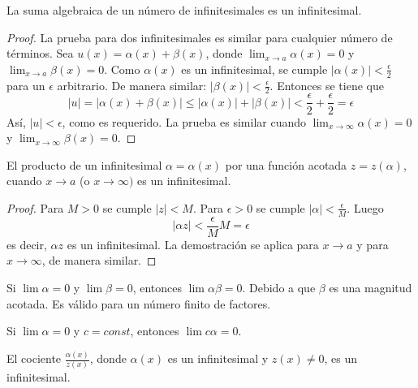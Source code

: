 \begin{theorem}
  La suma algebraica de un número de infinitesimales es un infinitesimal.
\end{theorem}

\begin{proof}
  La prueba para dos infinitesimales es similar para cualquier número de términos.
  Sea $u(x) = \alpha(x) + \beta(x)$, donde $\lim_{x \to a} \alpha(x) = 0$ y $\lim_{x \to a} \beta(x) = 0$.
  Como $\alpha(x)$ es un infinitesimal, se cumple $|\alpha(x)| < \frac{\epsilon}{2}$ para un $\epsilon$ arbitrario.
  De manera similar: $|\beta(x)| < \frac{\epsilon}{2}$. Entonces se tiene que
  $$|u| = |\alpha(x) + \beta(x)| \le |\alpha(x)| + |\beta(x)| < \frac{\epsilon}{2} + \frac{\epsilon}{2} = \epsilon$$
  Así, $|u| < \epsilon$, como es requerido.
  La prueba es similar cuando $\lim_{x \to \infty} \alpha(x) = 0$ y $\lim_{x \to \infty} \beta(x) = 0$.
\end{proof}


\begin{theorem} \label{sec:inf:teo:infxfunc}
  El producto de un infinitesimal $\alpha = \alpha(x)$ por una función acotada $z = z(\alpha)$, cuando $x \to a$ (o $x \to \infty)$ es un infinitesimal.
\end{theorem}

\begin{proof}
  Para $M > 0$ se cumple $|z| < M$. Para $\epsilon > 0$ se cumple $|\alpha| < \frac{\epsilon}{M}$. Luego $$|\alpha z| < \frac {\epsilon} {M} M = \epsilon$$
  es decir, $\alpha z$ es un infinitesimal. La demostración se aplica para $x \to a$ y para $x \to \infty$, de manera similar.
\end{proof}


\begin{corollary}
  Si $\lim \alpha = 0$ y $\lim \beta = 0$, entonces $\lim \alpha \beta = 0$.
  Debido a que $\beta$ es una magnitud acotada. Es válido para un número finito de factores.
\end{corollary}


\begin{corollary}
  Si $\lim \alpha = 0$ y $c = const$, entonces $\lim c\alpha = 0$.
\end{corollary}


\begin{theorem} \label{sec:inf:teo:coci}
  El cociente $\frac {\alpha(x)} {z(x)}$, donde $\alpha(x)$ es un infinitesimal y $z(x) \ne 0$, es un infinitesimal.
\end{theorem}

